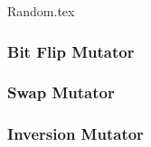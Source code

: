   {Random.tex}
  \subsubsection{Bit Flip Mutator}
  \label{sec:keen:operators:mutation:bit_flip}
  \Blindtext

  \subsubsection{Swap Mutator}
  \label{sec:keen:operators:mutation:swap}
  \Blindtext

  \subsubsection{Inversion Mutator}
  \label{sec:keen:operators:mutation:inversion}
  \Blindtext
